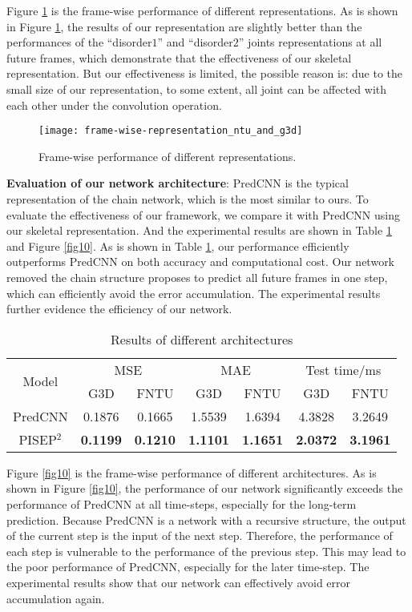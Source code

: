 \documentclass[journal]{IEEEtran}
\begin{document}
Figure \ref{fig9} is the frame-wise performance of different representations. As is shown in Figure \ref{fig9}, the results of our representation are slightly better than the performances of the ``disorder${1}$'' and ``disorder${2}$'' joints representations at all future frames, which demonstrate that the effectiveness of our skeletal representation. But our effectiveness is limited, the possible reason is: due to the small size of our representation, to some extent, all joint can be affected with each other under the convolution operation.

\begin{figure}[!t]
\centering
\texttt{[image: frame-wise-representation\_ntu\_and\_g3d]}
\caption{Frame-wise performance of different representations.}
\label{fig9}
\end{figure}

{\bf Evaluation of our network architecture}: PredCNN \cite{predcnn} is the typical representation of the chain network, which is the most similar to ours. To evaluate the effectiveness of our framework, we compare it with PredCNN using our skeletal representation. And the experimental results are shown in Table \ref{table3} and Figure \ref{fig10}. As is shown in Table \ref{table3}, our performance efficiently outperforms PredCNN on both accuracy and computational cost. Our network removed the chain structure proposes to predict all future frames in one step, which can efficiently avoid the error accumulation. The experimental results further evidence the efficiency of our network.

\begin{table}[!t]
\renewcommand{\arraystretch}{1.3}
\caption{Results of different architectures}
\label{table3}
\centering
\begin{tabular}{ccccccc}
\hline
\multirow{2}{*}{Model}& \multicolumn{2}{c}{MSE} & \multicolumn{2}{c}{MAE} & \multicolumn{2}{c}{Test time/ms} \\
 \cline{2-5}& G3D &FNTU & G3D &FNTU & G3D &FNTU \\
\hline
PredCNN\cite{predcnn}&0.1876&0.1665&1.5539&1.6394&4.3828&3.2649 \\
PISEP${^2}$&{\bf 0.1199}&{\bf 0.1210}&{\bf 1.1101}&{\bf 1.1651}&{\bf 2.0372}&{\bf 3.1961} \\
\hline
\end{tabular}
\end{table}

Figure \ref{fig10} is the frame-wise performance of different architectures. As is shown in Figure \ref{fig10}, the performance of our network significantly exceeds the performance of PredCNN at all time-steps, especially for the long-term prediction. Because PredCNN is a network with a recursive structure, the output of the current step is the input of the next step. Therefore, the performance of each step is vulnerable to the performance of the previous step. This may lead to the poor performance of PredCNN, especially for the later time-step. The experimental results show that our network can effectively avoid error accumulation again.
\end{document}
